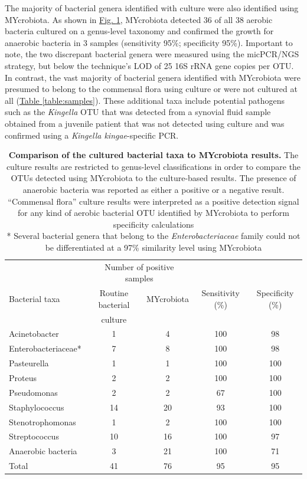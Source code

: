 The majority of bacterial genera identified with culture were also identified using MYcrobiota. As shown in \hyperref[table:comparison]{Fig. \ref{table:comparison}}, MYcrobiota detected 36 of all 38 aerobic bacteria cultured on a genus-level taxonomy and confirmed the growth for anaerobic bacteria in 3 samples (sensitivity 95\%; specificity 95\%). Important to note, the two discrepant bacterial genera were measured using the micPCR/NGS strategy, but below the technique’s LOD of 25 16S rRNA gene copies per OTU. In contrast, the vast majority of bacterial genera identified with MYcrobiota were presumed to belong to the commensal flora using culture or were not cultured at all (\hyperref[table:samples]{Table \ref{table:samples}}). These additional taxa include potential pathogens such as the \textit{Kingella} OTU that was detected from a synovial fluid sample obtained from a juvenile patient that was not detected using culture and was confirmed using a \textit{Kingella kingae}-specific PCR.

\begin{table}
\begin{tabular}{lcccc}
               & \multicolumn{2}{c}{Number of positive samples} &                  &                  \\
Bacterial taxa & Routine bacterial  & MYcrobiota                 & Sensitivity (\%) & Specificity (\%) \\
               & culture            &                            &                  &                  \\ \hline
Acinetobacter       & 1  & 4  & 100 & 98 \\
Enterobacteriaceae* & 7  & 8  & 100 & 98 \\
Pasteurella         & 1  & 1  & 100 & 100 \\
Proteus             & 2  & 2  & 100 & 100 \\
Pseudomonas         & 2  & 2  & 67  & 100 \\
Staphylococcus      & 14 & 20 & 93  & 100 \\
Stenotrophomonas    & 1  & 2  & 100 & 100 \\
Streptococcus       & 10 & 16 & 100 & 97  \\
Anaerobic bacteria  & 3  & 21 & 100 & 71  \\ \hline
Total               & 41 & 76 & 95  & 95
\end{tabular}
\caption{\textbf{Comparison of the cultured bacterial taxa to MYcrobiota results.} The culture results are restricted to genus-level classifications in order to compare the OTUs detected using MYcrobiota to the culture-based results. The presence of anaerobic bacteria was reported as either a positive or a negative result. “Commensal flora” culture results were interpreted as a positive detection signal for any kind of aerobic bacterial OTU identified by MYcrobiota to perform specificity calculations \\ * Several bacterial genera that belong to the \textit{Enterobacteriaceae} family could not be differentiated at a 97\% similarity level using MYcrobiota}
\label{table:comparison}
\end{table}

